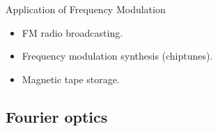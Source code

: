     \begin{block}{Application of Frequency Modulation}
      \begin{itemize}
        \item FM radio broadcasting.
        \item Frequency modulation synthesis (chiptunes).
        \item Magnetic tape storage. 
      \end{itemize}
    \end{block}

\subsection{Fourier optics}
\label{sec:}